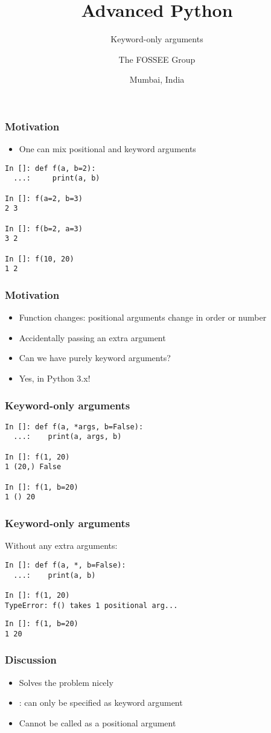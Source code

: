 \documentclass[14pt,compress]{beamer}
\title[only kwargs]{Advanced Python}
\subtitle{Keyword-only arguments}
\author[FOSSEE] {The FOSSEE Group}
\institute[IIT Bombay] {Department of Aerospace Engineering\\IIT Bombay}
\date[] {Mumbai, India}
\begin{document}
\begin{frame}
  \titlepage
\end{frame}

\begin{frame}[fragile]
  \frametitle{Motivation}
  \begin{itemize}
  \item One can mix positional and keyword arguments
  \end{itemize}
  \begin{lstlisting}
In []: def f(a, b=2):
  ...:     print(a, b)

In []: f(a=2, b=3)
2 3

In []: f(b=2, a=3)
3 2

In []: f(10, 20)
1 2
\end{lstlisting}
\end{frame}

\begin{frame}[fragile]
  \frametitle{Motivation}
  \begin{itemize}
  \item Function changes: positional arguments change in order or number
  \item Accidentally passing an extra argument
  \item Can we have purely keyword arguments?

    \vspace*{0.5in}
  \item Yes, in Python 3.x!
  \end{itemize}
\end{frame}

\begin{frame}[fragile]
  \frametitle{Keyword-only arguments}
  \begin{lstlisting}
In []: def f(a, *args, b=False):
  ...:    print(a, args, b)

In []: f(1, 20)
1 (20,) False

In []: f(1, b=20)
1 () 20
\end{lstlisting}
\end{frame}

\begin{frame}[fragile]
  \frametitle{Keyword-only arguments}
 \noindent Without any extra arguments:
\vspace*{0.25in}
  \begin{lstlisting}
In []: def f(a, *, b=False):
  ...:    print(a, b)

In []: f(1, 20)
TypeError: f() takes 1 positional arg...
\end{lstlisting}
\pause
  \begin{lstlisting}
In []: f(1, b=20)
1 20
  \end{lstlisting}
\end{frame}

\begin{frame}
  \frametitle{Discussion}
  \begin{itemize}
  \item Solves the problem nicely
  \item {}: can only be specified as keyword argument

  \item Cannot be called as a positional argument
  \end{itemize}
\end{frame}
\end{document}
